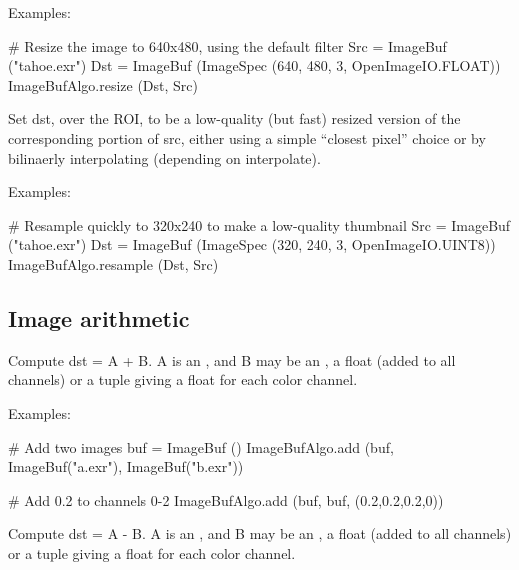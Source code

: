 \smallskip
\noindent Examples:
\begin{code}
    # Resize the image to 640x480, using the default filter
    Src = ImageBuf ("tahoe.exr")
    Dst = ImageBuf (ImageSpec (640, 480, 3, OpenImageIO.FLOAT))
    ImageBufAlgo.resize (Dst, Src)
\end{code}
\apiend


 
Set {\cf dst}, over the ROI, to be a low-quality (but fast) resized version
of the corresponding portion of {\cf src}, either using a simple ``closest
pixel'' choice or by bilinaerly interpolating (depending on {\cf
interpolate}).

\smallskip
\noindent Examples:
\begin{code}
    # Resample quickly to 320x240 to make a low-quality thumbnail
    Src = ImageBuf ("tahoe.exr")
    Dst = ImageBuf (ImageSpec (320, 240, 3, OpenImageIO.UINT8))
    ImageBufAlgo.resample (Dst, Src)
\end{code}
\apiend



\subsection{Image arithmetic}
\label{sec:iba:py:arith}

 

Compute {\cf dst = A + B}.  {\cf A} is an \ImageBuf, and {\cf B}  may
be an \ImageBuf, a {\cf float} (added to all channels) or a tuple giving a
{\cf float} for each color channel.

\smallskip
\noindent Examples:
\begin{code}
    # Add two images
    buf = ImageBuf ()
    ImageBufAlgo.add (buf, ImageBuf("a.exr"), ImageBuf("b.exr"))

    # Add 0.2 to channels 0-2 
    ImageBufAlgo.add (buf, buf, (0.2,0.2,0.2,0))
\end{code}
\apiend


 

Compute {\cf dst = A - B}.  {\cf A} is an \ImageBuf, and {\cf B}  may
be an \ImageBuf, a {\cf float} (added to all channels) or a tuple giving a
{\cf float} for each color channel.

